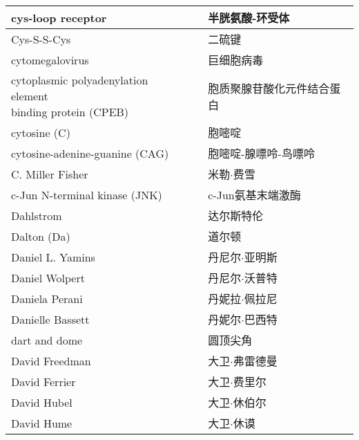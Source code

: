 \begin{longtable}{lll}
	\midrule
	cys-loop receptor    &&  半胱氨酸-环受体  \\
	
	\midrule
	Cys-S-S-Cys    &&  二硫键  \\
	
	\midrule
	cytomegalovirus    &&  巨细胞病毒  \\
	
	\midrule
	\makecell[l]{cytoplasmic polyadenylation element \\ binding protein  (CPEB)}   &&  胞质聚腺苷酸化元件结合蛋白  \\
	
	\midrule
	cytosine (C)     &&  胞嘧啶  \\
	
	\midrule
	cytosine-adenine-guanine (CAG)     &&  胞嘧啶-腺嘌呤-鸟嘌呤  \\
	
	\midrule
	C. Miller Fisher     &&  米勒$\cdot$费雪  \\
	
	\midrule
	c-Jun N-terminal kinase (JNK)    &&  c-Jun氨基末端激酶  \\
	
	\midrule
	Dahlstrom   &&  达尔斯特伦  \\
	
	\midrule
	Dalton (Da)   &&  道尔顿  \\
	
	\midrule
	Daniel L. Yamins     &&  丹尼尔$\cdot$亚明斯  \\
	
	\midrule
	Daniel Wolpert     &&  丹尼尔$\cdot$沃普特  \\
	
	\midrule
	Daniela Perani     &&  丹妮拉$\cdot$佩拉尼  \\
	
	\midrule
	Danielle Bassett     &&  丹妮尔$\cdot$巴西特  \\
	
	\midrule
	dart and dome     &&  圆顶尖角  \\
	
	\midrule
	David Freedman     &&  大卫$\cdot$弗雷德曼  \\
	
	\midrule
	David Ferrier     &&  大卫$\cdot$费里尔  \\
	
	\midrule
	David Hubel     &&  大卫$\cdot$休伯尔  \\
	
	\midrule
	David Hume     &&  大卫$\cdot$休谟  \\
	

\end{longtable}
